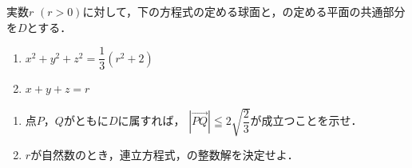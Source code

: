 \documentclass[../../main.tex]{subfiles}
\begin{document}
実数$r$ $(r>0)$に対して，下の方程式の定める球面と，の定める平面の共通部分を$D$とする．
\begin{enumerate}
  \item [\ding{"AC}]$\displaystyle x^2+y^2+z^2=\dfrac{1}{3}(r^2+2)$
  \item [\ding{"AD}]$x+y+z=r$
\end{enumerate}
\begin{enumerate}
  \item 点$P$，$Q$がともに$D$に属すれば，
    $|\overrightarrow{PQ}|\leqq2\sqrt{\displaystyle\dfrac{2}{3}}$が成立つことを示せ．
  \item $r$が自然数のとき，連立方程式，の整数解を決定せよ．
\end{enumerate}
\end{document}
